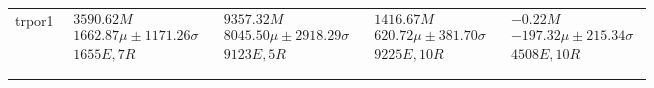 \begin{tabular}{|l|p{3.2cm}|p{3.2cm}|p{3.2cm}|p{3.2cm}|}
trpor1 & $\begin{array}{c} 3590.62M \\ 1662.87\mu \pm 1171.26\sigma \\ 1655E, 7R \end{array}$ & $\begin{array}{c} 9357.32M \\ 8045.50\mu \pm 2918.29\sigma \\ 9123E, 5R \end{array}$ & $\begin{array}{c} 1416.67M \\ 620.72\mu \pm 381.70\sigma \\ 9225E, 10R \end{array}$ & $\begin{array}{c} -0.22M \\ -197.32\mu \pm 215.34\sigma \\ 4508E, 10R \end{array}$ \\ \\ \hline
\bottomrule \\ \hline
\end{tabular}
